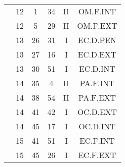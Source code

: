 \documentclass[12pt, a4paper]{article}
\begin{document}
\begin{multicols}{3}
{\begin{tabular}{c c c c c c}
	 	 	 	 & 12 & 1 & 34 & II & OM.F.INT\\%
	 	 	 	 & 12 & 5 & 29 & II & OM.F.EXT\\%
	 	 	 	 & 13 & 26 & 31 & I & EC.D.PEN\\%
	 	 	 	 & 13 & 27 & 16 & I & EC.D.EXT\\%
	 	 	 	 & 13 & 30 & 51 & I & EC.D.INT\\%
	 	 	 	 & 14 & 35 & 4 & II & PA.F.INT\\%
	 	 	 	 & 14 & 38 & 54 & II & PA.F.EXT\\%
	 	 	 	 & 14 & 41 & 42 & I & OC.D.EXT\\%
	 	 	 	 & 14 & 45 & 17 & I & OC.D.INT\\%
	 	 	 	 & 15 & 41 & 51 & I & EC.F.INT\\%
	 	 	 	 & 15 & 45 & 26 & I & EC.F.EXT\\%
	 	 \end{tabular}
 	}
\end{multicols}
\end{document}
